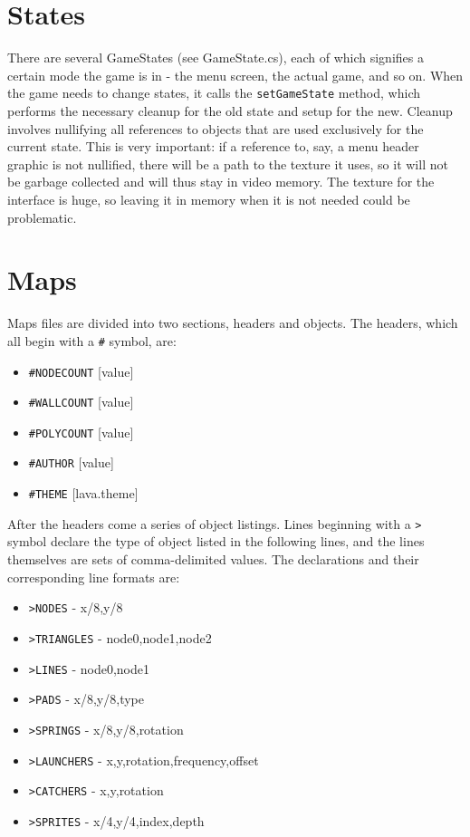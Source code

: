 \documentclass [12pt]{article}
\begin{document}
\section{States}
There are several GameStates (see GameState.cs), each of which signifies a certain mode the game is in - the menu screen, the actual game, and so on. When the game needs to change states, it calls the \texttt{setGameState} method, which performs the necessary cleanup for the old state and setup for the new. Cleanup involves nullifying all references to objects that are used exclusively for the current state. This is very important: if a reference to, say, a menu header graphic is not nullified, there will be a path to the texture it uses, so it will not be garbage collected and will thus stay in video memory. The texture for the interface is huge, so leaving it in memory when it is not needed could be problematic.
\section{Maps}
Maps files are divided into two sections, headers and objects. The headers, which all begin with a \texttt{\#} symbol, are:

\begin{itemize}
	\item \texttt{\#NODECOUNT} [value]
	\item \texttt{\#WALLCOUNT} [value]
	\item \texttt{\#POLYCOUNT} [value]
	\item \texttt{\#AUTHOR} [value]
	\item \texttt{\#THEME} [lava.theme]
\end{itemize}

After the headers come a series of object listings. Lines beginning with a \texttt{>} symbol declare the type of object listed in the following lines, and the lines themselves are sets of comma-delimited values. The declarations and their corresponding line formats are:

\begin{itemize}
	\item \texttt{>NODES} - x/8,y/8
	\item \texttt{>TRIANGLES} - node0,node1,node2
	\item \texttt{>LINES} - node0,node1
	\item \texttt{>PADS} - x/8,y/8,type
	\item \texttt{>SPRINGS} - x/8,y/8,rotation
	\item \texttt{>LAUNCHERS} - x,y,rotation,frequency,offset
	\item \texttt{>CATCHERS} - x,y,rotation
	\item \texttt{>SPRITES} - x/4,y/4,index,depth
\end{itemize}
\end{document}
